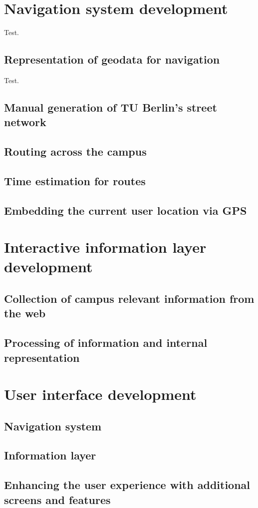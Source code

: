 \section{Navigation system development}
Test.

\subsection{Representation of geodata for navigation}
Test.

\subsection{Manual generation of TU Berlin's street network}
\subsection{Routing across the campus}
\subsection{Time estimation for routes}
\subsection{Embedding the current user location via GPS}

\section{Interactive information layer development}
\subsection{Collection of campus relevant information from the web}
\subsection{Processing of information and internal representation}

\section{User interface development}
\subsection{Navigation system}
\subsection{Information layer}
\subsection{Enhancing the user experience with additional screens and features}